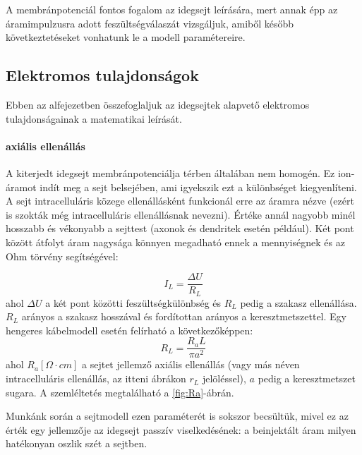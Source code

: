 A membránpotenciál fontos fogalom az idegsejt leírására, mert annak épp az áramimpulzusra adott feszültségválaszát vizsgáljuk, amiből később következtetéseket vonhatunk le a modell paramétereire.












\subsection{Elektromos tulajdonságok}
Ebben az alfejezetben összefoglaljuk az idegsejtek alapvető elektromos tulajdonságainak a matematikai leírását.

\paragraph{axiális ellenállás}\label{par:Ra}
A kiterjedt idegsejt membránpotenciálja térben általában nem homogén. Ez ion-áramot indít meg a sejt belsejében, ami igyekszik ezt a különbséget kiegyenlíteni. A sejt intracelluláris közege ellenállásként funkcionál erre az áramra nézve (ezért is szokták még intracelluláris ellenállásnak nevezni). Értéke annál nagyobb minél hosszabb és vékonyabb a sejttest (axonok és dendritek esetén például). Két pont között átfolyt áram nagysága könnyen megadható ennek a mennyiségnek és az Ohm törvény segítségével:

\begin{equation}
	I_L = \dfrac{\Delta U}{R_L}
\end{equation}
ahol $\Delta U$ a két pont közötti feszültségkülönbség és $R_L$ pedig a szakasz ellenállása.
$R_L$ arányos a szakasz hosszával és fordítottan arányos a keresztmetszettel. Egy hengeres kábelmodell esetén felírható a következőképpen:
\begin{equation}\label{eq:r_L}
	R_L = \dfrac{R_a L}{\pi a^2}
\end{equation}
ahol $R_a \left[\Omega\cdot cm\right]$ a sejtet jellemző axiális ellenállás (vagy más néven intracelluláris ellenállás, az itteni ábrákon $r_L$ jelöléssel), $a$ pedig a keresztmetszet sugara. A szemléltetés megtalálható a \ref{fig:Ra}-ábrán.

Munkánk során a sejtmodell ezen paraméterét is sokszor becsültük, mivel ez az érték egy jellemzője az idegsejt passzív viselkedésének: a beinjektált áram milyen hatékonyan oszlik szét a sejtben.


